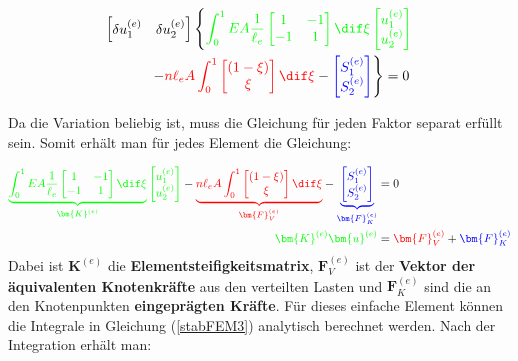 \begin{align}
 \begin{bmatrix} \delta u_1^{(e)} & \delta u_2^{(e)}\end{bmatrix}\left\{ \textcolor{green}{   \int_{0}^{1} EA \frac{1}{\ell_e} \begin{bmatrix} 1 & -1 \\ -1 & 1\end{bmatrix}  \dif\xi \begin{bmatrix} u_1^{(e)} \\ u_2^{(e)}\end{bmatrix}} \right .\\
 \left .- \textcolor{red}{n \ell_e A \int_0^{1} \begin{bmatrix} (1-\xi)  \\ \xi \end{bmatrix}   \dif\xi} - \textcolor{blue}{ \begin{bmatrix} S_1^{(e)} \\ S_2^{(e)} \end{bmatrix}} \right\}  = 0\; 
\end{align}

Da die Variation beliebig ist, muss die Gleichung für jeden Faktor separat erfüllt sein. Somit erhält man für jedes Element die Gleichung:

\begin{align}
  \textcolor{green}{   \underbrace{\int_{0}^{1} EA \frac{1}{\ell_e} \begin{bmatrix} 1 & -1 \\ -1 & 1\end{bmatrix}  \dif\xi}_{\bm{K}^{(e)}} \begin{bmatrix} u_1^{(e)} \\ u_2^{(e)}\end{bmatrix}} 
 - \textcolor{red}{ \underbrace{n \ell_e A \int_0^{1} \begin{bmatrix} (1-\xi) \\ \xi  \end{bmatrix}   \dif\xi}_{\bm{F}_V^{(e)}}} - \textcolor{blue}{ \underbrace{\begin{bmatrix} S_1^{(e)} \\ S_2^{(e)} \end{bmatrix}}_{\bm{F}_K^{(e)}}}  & = 0\; \\
 \textcolor{green}{\bm{K}^{(e)} \bm{u}^{(e)}} &=  \textcolor{red}{\bm{F}_V^{(e)}} + \textcolor{blue}{\bm{F}_K^{(e)} } 
\end{align}
Dabei ist $\bm{K}^{(e)}$ die \textbf{Elementsteifigkeitsmatrix}, $\bm{F}_V^{(e)}$ ist der \textbf{Vektor der äquivalenten Knotenkräfte} aus den verteilten Lasten und $\bm{F}_K^{(e)}$ sind die an den Knotenpunkten \textbf{eingeprägten Kräfte}. Für dieses einfache Element können die Integrale in Gleichung (\ref{stabFEM3}) analytisch berechnet werden. Nach der Integration erhält man:

